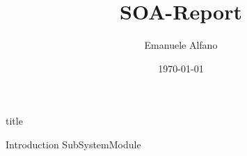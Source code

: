 \documentclass[a4paper,10pt]{article}
\title{SOA-Report}
\author{Emanuele Alfano}
\date{\today}
\begin{document}

{title}

\frontmatter

\tableofcontents

\listoffigures
\listoftables

\mainmatter


{Introduction}
\newpage
{SubSystemModule}


\newpage
\printbibliography[heading = bibintoc]    %
\end{document}
